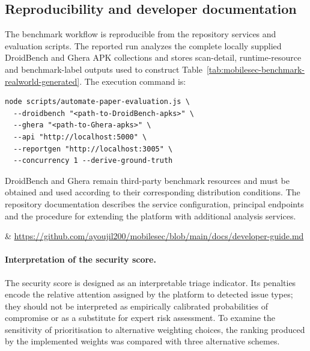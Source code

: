 \subsection{Reproducibility and developer documentation}

The benchmark workflow is reproducible from the repository services and
evaluation scripts. The reported run analyzes the complete locally supplied
DroidBench and Ghera APK collections and stores scan-detail, runtime-resource
and benchmark-label outputs used to construct
Table~\ref{tab:mobilesec-benchmark-realworld-generated}. The execution command
is:

\begin{verbatim}
node scripts/automate-paper-evaluation.js \
  --droidbench "<path-to-DroidBench-apks>" \
  --ghera "<path-to-Ghera-apks>" \
  --api "http://localhost:5000" \
  --reportgen "http://localhost:3005" \
  --concurrency 1 --derive-ground-truth
\end{verbatim}

DroidBench and Ghera remain third-party benchmark resources and must be
obtained and used according to their corresponding distribution conditions.
The repository documentation describes the service configuration, principal
endpoints and the procedure for extending the platform with additional
analysis services.

& \url{https://github.com/ayoujil200/mobilesec/blob/main/docs/developer-guide.md} \\

\paragraph{Interpretation of the security score.}
The security score is designed as an interpretable triage indicator. Its
penalties encode the relative attention assigned by the platform to detected
issue types; they should not be interpreted as empirically calibrated
probabilities of compromise or as a substitute for expert risk assessment. To
examine the sensitivity of prioritisation to alternative weighting choices,
the ranking produced by the implemented weights was compared with three
alternative schemes.

